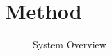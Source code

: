 \section{Method}
\label{sec:method}

\begin{figure}[htbp]
\centering
\caption{System Overview}
\label{fig:overview}
\end{figure}


